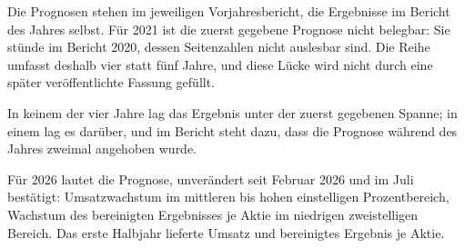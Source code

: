 Die Prognosen stehen im jeweiligen Vorjahresbericht,
die Ergebnisse im Bericht des Jahres selbst.
F\"ur 2021 ist die zuerst gegebene Prognose nicht belegbar: Sie st\"unde im
Bericht 2020, dessen Seitenzahlen nicht auslesbar sind. Die Reihe umfasst
deshalb vier statt f\"unf Jahre, und diese L\"ucke wird nicht durch eine
sp\"ater ver\"offentlichte Fassung gef\"ullt.

In keinem der vier Jahre lag das Ergebnis unter der zuerst gegebenen Spanne;
in einem lag es dar\"uber, und im Bericht steht dazu, dass die Prognose
w\"ahrend des Jahres zweimal angehoben wurde.

F\"ur 2026 lautet die Prognose, unver\"andert seit Februar 2026 und im Juli
best\"atigt: Umsatzwachstum im mittleren bis hohen einstelligen
Prozentbereich, Wachstum des bereinigten Ergebnisses je Aktie im niedrigen
zweistelligen Bereich.
Das erste Halbjahr lieferte \MioUSD{\AznUmsatzHJ} Umsatz und
\USDje{\AznCoreErgebnisJeAktieHJ} bereinigtes Ergebnis je
Aktie.

